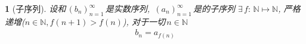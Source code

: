 \newtheorem{subsequences}[theorem_root]{}
\begin{subsequences}[子序列]
设\unseq 和\(\,(b_n)_{n=1}^\infty\,\)是实数序列, \(\,(a_n)_{n=1}^\infty\,\)是\unseq 的子序列
\equalwith \(\exists\,f:\,\mathbb{N}\mapsto\mathbb{N}\), 严格递增(\(n\in\mathbb{N}, f(n+1)>f(n)\)), 对于一切\(\,n\in\mathbb{N}\)
\begin{align*}
b_n = a_{f(n)}
\end{align*}
\end{subsequences}



